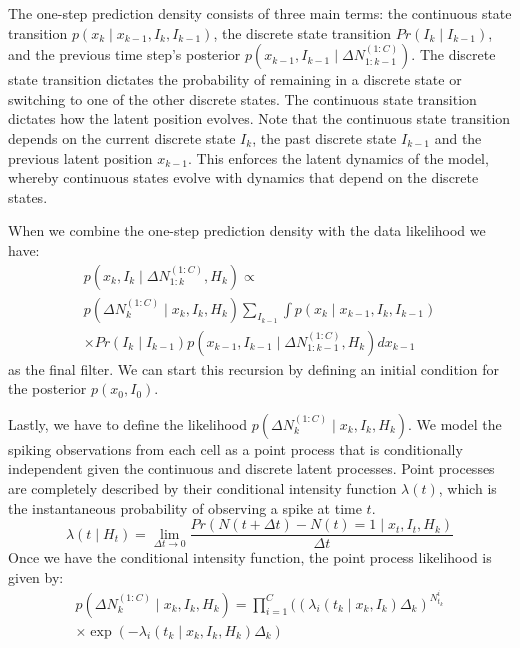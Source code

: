 \documentclass[conference]{IEEEtran}
\begin{document}
The one-step prediction density consists of three main terms: the continuous state transition $p(x_{k} \mid x_{k-1}, I_{k}, I_{k-1})$, the discrete state transition $Pr(I_{k} \mid I_{k-1})$, and the previous time step's posterior $p(x_{k-1}, I_{k-1} \mid \Delta N_{1:k-1}^{(1:C)})$. The discrete state transition dictates the probability of remaining in a discrete state or switching to one of the other discrete states. The continuous state transition dictates how the latent position evolves. Note that the continuous state transition depends on the current discrete state $I_{k}$, the past discrete state $I_{k-1}$ and the previous latent position $x_{k-1}$. This enforces the latent dynamics of the model, whereby continuous states evolve with dynamics that depend on the discrete states.

When we combine the one-step prediction density with the data likelihood we have:
\begin{multline}
p(x_{k}, I_{k} \mid \Delta N_{1:k}^{(1:C)}, H_{k}) \propto \\
p(\Delta N_{k}^{(1:C)}  \mid x_{k}, I_{k}, H_{k}) \sum_{I_{k-1}} \int p(x_{k} \mid x_{k-1}, I_{k}, I_{k-1}) \\
\times Pr(I_{k} \mid I_{k-1}) p(x_{k-1}, I_{k-1} \mid \Delta N_{1:k-1}^{(1:C)}, H_{k}) dx_{k-1}
\end{multline}
as the final filter. We can start this recursion by defining an initial condition for the posterior $p(x_{0}, I_{0})$.

Lastly, we have to define the likelihood $p(\Delta N_{k}^{(1:C)} \mid x_{k}, I_{k}, H_{k})$. We model the spiking observations from each cell as a point process that is conditionally independent given the continuous and discrete latent processes. Point processes are completely described by their conditional intensity function $\lambda(t)$, which is the instantaneous probability of observing a spike at time $t$.
\begin{equation}
    \lambda(t \mid H_{t}) = \lim_{\Delta t \rightarrow{0}} \frac{Pr(N(t + \Delta t) - N(t) = 1 \mid x_{t}, I_{t}, H_{k})}{\Delta t}
\end{equation}
Once we have the conditional intensity function, the point process likelihood is given by:
\begin{multline}
    p(\Delta N_{k}^{(1:C)} \mid x_{k}, I_{k}, H_{k}) = \prod^{C}_{i=1} ((\lambda_{i}(t_{k} \mid x_{k}, I_{k})\Delta_{k})^{N_{t_{k}}^{i}} \\
    \times \exp(-\lambda_{i}(t_{k} \mid x_{k}, I_{k}, H_{k})\Delta_{k})
\end{multline}
\end{document}
